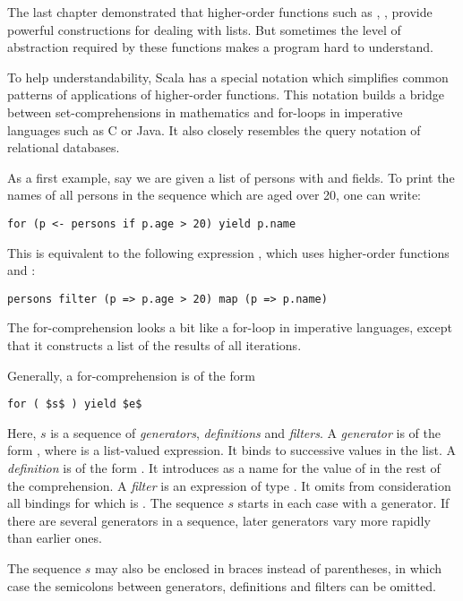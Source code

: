 The last chapter demonstrated that higher-order functions such as
\verb@map@, \verb@flatMap@, \verb@filter@ provide powerful
constructions for dealing with lists.  But sometimes the level of
abstraction required by these functions makes a program hard to
understand.

To help understandability, Scala has a special notation which
simplifies common patterns of applications of higher-order functions.
This notation builds a bridge between set-comprehensions in
mathematics and for-loops in imperative languages such as C or
Java. It also closely resembles the query notation of relational
databases.

As a first example, say we are given a list  of persons
with  and  fields.  To print the names of all
persons in the sequence which are aged over 20, one can write:
\begin{lstlisting}
for (p <- persons if p.age > 20) yield p.name
\end{lstlisting}
This is equivalent to the following expression , which uses
higher-order functions  and :
\begin{lstlisting}
persons filter (p => p.age > 20) map (p => p.name)
\end{lstlisting}
The for-comprehension looks a bit like a for-loop in imperative languages,
except that it constructs a list of the results of all iterations.

Generally, a for-comprehension is of the form
\begin{lstlisting}
for ( $s$ ) yield $e$
\end{lstlisting}
Here, $s$ is a sequence of {\em generators}, {\em definitions} and
{\em filters}.  A {\em generator} is of the form ,
where  is a list-valued expression. It binds  to
successive values in the list.  A {\em definition} is of the form
. It introduces  as a name for the value of
 in the rest of the comprehension. A {\em filter} is an
expression  of type .  It omits from
consideration all bindings for which  is .  The
sequence $s$ starts in each case with a generator.  If there are
several generators in a sequence, later generators vary more rapidly
than earlier ones.

The sequence $s$ may also be enclosed in braces instead of
parentheses, in which case the semicolons between generators,
definitions and filters can be omitted.

